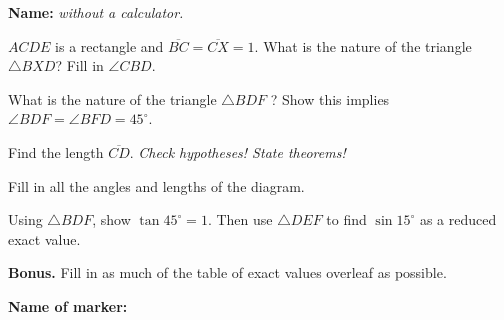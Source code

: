\documentclass[9pt]{exam}
\begin{document}
\textbf{Name:} \dotfill \emph{without a calculator.}

\begin{center}
\end{center}


\begin{questions}

\question[2] $ACDE$ is a rectangle and $\overline{BC} = \overline{CX} = 1$. What is the nature of the triangle $\triangle BXD$? Fill in $\angle CBD$.
\fillwithdottedlines{8mm}

\question[2] What is the nature of the triangle $\triangle BDF$ ? Show this implies $\angle BDF = \angle BFD = 45^\circ$.
\fillwithdottedlines{18mm}

\question[3] Find the length $\overline{CD}$. \hfill \emph{Check hypotheses! State theorems!}

\fillwithdottedlines{27mm}

\question[6] Fill in all the angles and lengths of the diagram.

\question[2] Using $\triangle BDF$, show $\tan 45^\circ = 1$. Then use $\triangle DEF$ to find $\sin 15^\circ$ as a reduced exact value.

\question[0] \textbf{Bonus.} Fill in as much of the table of exact values overleaf as possible.

\end{questions}

\begin{tcolorbox}

\textbf{Name of marker:}

\begin{center}
\gradetable[h][questions]
\end{center}

\end{tcolorbox}
\end{document}
